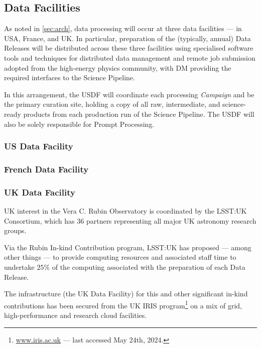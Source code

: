\subsection{Data Facilities} \label{sec:datafacilities}

As noted in \autoref{sec:arch}, data processing will occur at three data facilities --- in USA, France, and UK. In particular, preparation of the (typically, annual) Data Releases will be distributed across these three facilities using specialised software tools and techniques for distributed data management and remote job submission adopted from the high-energy physics community, with DM providing the required interfaces to the Science Pipeline.

In this arrangement, the USDF will coordinate each processing {\em Campaign} and be the primary curation site, holding a copy of all raw, intermediate, and science-ready products from each production run of the Science Pipeline. The USDF will also be solely responsible for Prompt Processing.

\subsubsection{US Data Facility} \label{sec:usdf}

\subsubsection{French Data Facility} \label{sec:frdf}

\subsubsection{UK Data Facility} \label{sec:ukdf}

UK interest in the Vera C. Rubin Observatory is coordinated by the LSST:UK Consortium, which has 36 partners representing all major UK astronomy research groups.

Via the Rubin In-kind Contribution program, LSST:UK has proposed --- among other things --- to provide computing resources and associated staff time to undertake $25\%$ of the computing associated with the preparation of each Data Release.

The infrastructure (the UK Data Facility) for this and other significant in-kind contributions has been secured from the UK IRIS program\footnote{\url{www.iris.ac.uk} --- last accessed May 24th, 2024.} on a mix of grid, high-performance and research cloud facilities.

